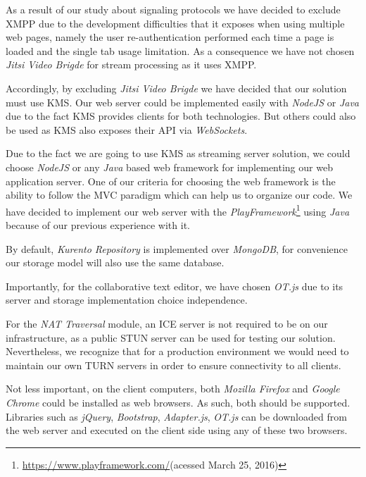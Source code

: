 As a result of our study about signaling protocols we have decided to exclude \ac{XMPP} due to the development difficulties that it exposes when using multiple web pages, namely the user re-authentication performed each time a page is loaded and the single tab usage limitation. As a consequence we have not chosen \emph{Jitsi Video Brigde} for stream processing as it uses \ac{XMPP}.

Accordingly, by excluding \emph{Jitsi Video Brigde} we have decided that our solution must use \ac{KMS}. Our web server could be implemented easily with \emph{NodeJS} or \emph{Java} due to the fact \ac{KMS} provides clients for both technologies. But others could also be used as \ac{KMS} also exposes their \ac{API} via \emph{WebSockets}.

Due to the fact we are going to use \ac{KMS} as streaming server solution, we could choose \emph{NodeJS} or any \emph{Java} based web framework for implementing our web application server. One of our criteria for choosing the web framework is the ability to follow the \ac{MVC} paradigm which can help us to organize our code. We have decided to implement our web server with the \emph{PlayFramework}\footnote{\url{https://www.playframework.com/}(acessed March 25, 2016)} using \emph{Java} because of our previous experience with it.

By default, \emph{Kurento Repository} is implemented over \emph{MongoDB}, for convenience our storage model will also use the same database.

Importantly, for the collaborative text editor, we have chosen \emph{OT.js} due to its server and storage implementation choice independence.

For the \emph{NAT Traversal} module, an \ac{ICE} server is not required to be on our infrastructure, as a public \ac{STUN} server can be used for testing our solution. Nevertheless, we recognize that for a production environment we would need to maintain our own \ac{TURN} servers in order to ensure connectivity to all clients.

Not less important, on the client computers, both \emph{Mozilla Firefox} and \emph{Google Chrome} could be installed as web browsers. As such, both should be supported. Libraries such as \emph{jQuery}, \emph{Bootstrap}, \emph{Adapter.js}, \emph{OT.js} can be downloaded from the web server and executed on the client side using any of these two browsers.


